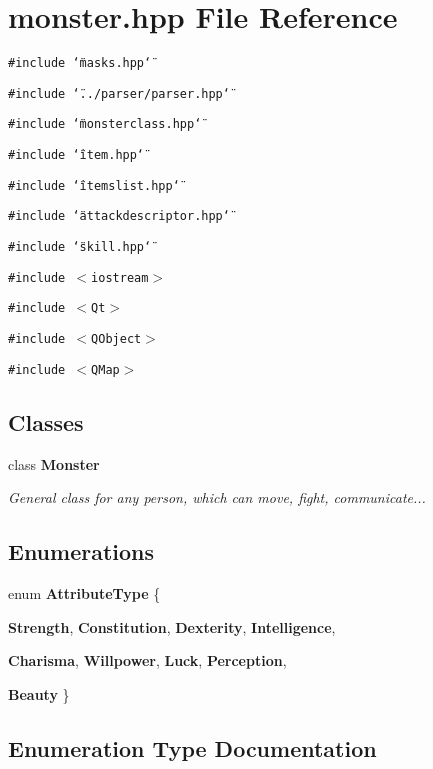 \section{monster.hpp File Reference}
\label{monster_8hpp}
{\tt \#include \char`\"{}masks.hpp\char`\"{}}\par
{\tt \#include \char`\"{}../parser/parser.hpp\char`\"{}}\par
{\tt \#include \char`\"{}monsterclass.hpp\char`\"{}}\par
{\tt \#include \char`\"{}item.hpp\char`\"{}}\par
{\tt \#include \char`\"{}itemslist.hpp\char`\"{}}\par
{\tt \#include \char`\"{}attackdescriptor.hpp\char`\"{}}\par
{\tt \#include \char`\"{}skill.hpp\char`\"{}}\par
{\tt \#include $<$iostream$>$}\par
{\tt \#include $<$Qt$>$}\par
{\tt \#include $<$QObject$>$}\par
{\tt \#include $<$QMap$>$}\par
\subsection*{Classes}
\begin{CompactItemize}
\item 
class {\bf Monster}
\begin{CompactList}\small\item\em General class for any person, which can move, fight, communicate... \item\end{CompactList}\end{CompactItemize}
\subsection*{Enumerations}
\begin{CompactItemize}
\item 
enum {\bf Attribute\-Type} \{ \par
{\bf Strength}, 
{\bf Constitution}, 
{\bf Dexterity}, 
{\bf Intelligence}, 
\par
{\bf Charisma}, 
{\bf Willpower}, 
{\bf Luck}, 
{\bf Perception}, 
\par
{\bf Beauty}
 \}
\end{CompactItemize}


\subsection{Enumeration Type Documentation}
